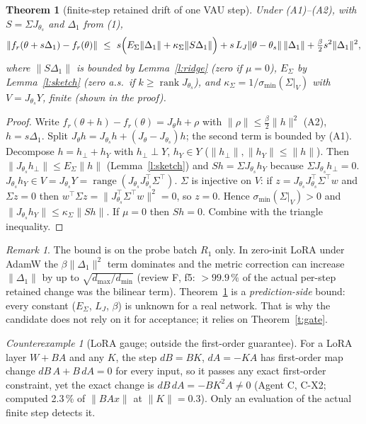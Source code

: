 \documentclass[11pt]{article}
\newtheorem{theorem}[proposition]{Theorem}
\theoremstyle{remark}
\newtheorem{remark}[proposition]{Remark}
\newtheorem{counterexample}[proposition]{Counterexample}
\begin{document}
\begin{theorem}[finite-step retained drift of one VAU step]\label{t:step}
Under (A1)--(A2), with $S=\Sigma J_{\theta_s}$ and $\Delta_1$ from (1),
\[ \|f_r(\theta+s\Delta_1)-f_r(\theta)\|\ \le\ s\Bigl(E_\Sigma\|\Delta_1\|+\kappa_\Sigma\|S\Delta_1\|\Bigr)
 + s\,L_J\|\theta-\theta_s\|\,\|\Delta_1\| + \tfrac{\beta}{2}s^2\|\Delta_1\|^2 , \]
where $\|S\Delta_1\|$ is bounded by Lemma~\ref{l:ridge} (zero if $\mu=0$), $E_\Sigma$ by Lemma~\ref{l:sketch} (zero a.s.\ if
$k\ge\operatorname{rank}J_{\theta_s}$), and $\kappa_\Sigma=1/\sigma_{\min}(\Sigma|_V)$ with $V=J_{\theta_s}Y$, finite (shown in the proof).
\end{theorem}
\begin{proof}
Write $f_r(\theta+h)-f_r(\theta)=J_\theta h+\rho$ with $\|\rho\|\le\frac\beta2\|h\|^2$ (A2), $h=s\Delta_1$. Split
$J_\theta h=J_{\theta_s}h+(J_\theta-J_{\theta_s})h$; the second term is bounded by (A1). Decompose $h=h_\perp+h_Y$ with $h_\perp\perp Y$, $h_Y\in Y$ ($\|h_\perp\|,\|h_Y\|\le\|h\|$). Then
$\|J_{\theta_s}h_\perp\|\le E_\Sigma\|h\|$ (Lemma~\ref{l:sketch}) and $Sh=\Sigma J_{\theta_s}h_Y$ because $\Sigma J_{\theta_s}h_\perp=0$.
$J_{\theta_s}h_Y\in V=J_{\theta_s}Y=\operatorname{range}(J_{\theta_s}J_{\theta_s}^\top\Sigma^\top)$. $\Sigma$ is injective on $V$:
if $z=J_{\theta_s}J_{\theta_s}^\top\Sigma^\top w$ and $\Sigma z=0$ then $w^\top\Sigma z=\|J_{\theta_s}^\top\Sigma^\top w\|^2=0$, so $z=0$.
Hence $\sigma_{\min}(\Sigma|_V)>0$ and $\|J_{\theta_s}h_Y\|\le\kappa_\Sigma\|Sh\|$. If $\mu=0$ then $Sh=0$. Combine with the
triangle inequality. \end{proof}
\begin{remark} The bound is on the probe batch $R_1$ only. In zero-init LoRA under AdamW the $\beta\|\Delta_1\|^2$ term dominates and the metric correction can increase $\|\Delta_1\|$ by up to $\sqrt{d_{\max}/d_{\min}}$ (review F, f5: $>99.9\,\%$ of the actual per-step retained change was the bilinear term). Theorem~\ref{t:step} is a \emph{prediction-side} bound: every constant ($E_\Sigma$, $L_J$, $\beta$) is
unknown for a real network. That is why the candidate does not rely on it for acceptance; it relies on Theorem~\ref{t:gate}.\end{remark}

\begin{counterexample}[LoRA gauge; outside the first-order guarantee]\label{c:gauge}
For a LoRA layer $W+BA$ and any $K$, the step $dB=BK$, $dA=-KA$ has first-order map change $dB\,A+B\,dA=0$ for every input,
so it passes any exact first-order constraint, yet the exact change is $dB\,dA=-BK^2A\ne0$ (Agent C, C-X2; computed
2.3\,\% of $\|BAx\|$ at $\|K\|=0.3$). Only an evaluation of the actual finite step detects it.
\end{counterexample}
\end{document}
